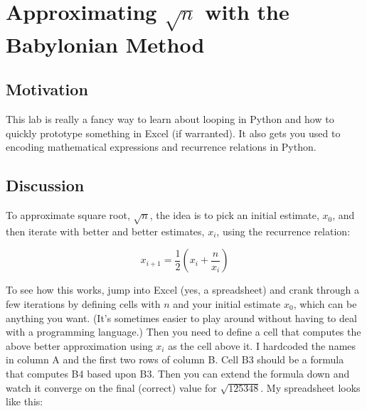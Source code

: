 \chapter{Approximating $\sqrt{n}$ with the Babylonian Method}

\setcounter{problem}{1}
\section{Motivation}

\begin{fullwidth}

This lab is really a fancy way to learn about looping in Python and how to quickly prototype something in Excel (if warranted). It also gets you used to encoding mathematical expressions and recurrence relations in Python.
 
\section{Discussion}

To approximate square root, $\sqrt{n}$, the idea is to pick an initial estimate, $x_0$, and then iterate with better and better estimates, $x_{i}$, using the recurrence relation:

\[
x_{i+1} = \frac{1}{2} (x_i + \frac{n}{x_i})
\]

To see how this works, jump into Excel (yes, a spreadsheet) and crank through a few iterations by defining cells with $n$ and your initial estimate $x_0$, which can be anything you want. (It's sometimes easier to play around without having to deal with a programming language.) Then you need to define a cell that computes the above better approximation using $x_i$ as the cell above it. I hardcoded the names in column A and the first two rows of column B. Cell B3 should be a formula that computes B4 based upon B3. Then you can extend the formula down and watch it converge on the final (correct) value for $\sqrt{125348}$. My spreadsheet looks like this:


\end{fullwidth}
